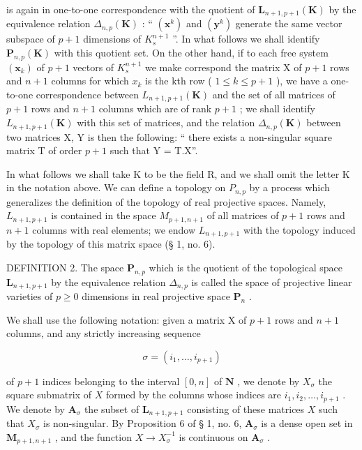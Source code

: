 is again in one-to-one correspondence with the quotient of \(\mathbf{L}_{n+1,p+1}(\mathbf{K})\) by the equivalence relation \(\Delta_{n,p}(\mathbf{K})\) : `` \((\mathbf{x}^{k})\) and \((\mathbf{y}^{k})\) generate the same vector subspace of \(p+1\) dimensions of \(K_{s}^{n+1}\) ''. In what follows we shall identify \(\mathbf{P}_{n,p}(\mathbf{K})\) with this quotient set. On the other hand, if to each free system \((\mathbf{x}_{k})\) of \(p+1\) vectors of \(K_{s}^{n+1}\) we make correspond the matrix X of \(p+1\) rows and \(n+1\) columns for which \(x_{k}\) is the kth row ( \(1\leqslant k\leqslant p+1\) ), we have a one-to-one correspondence between \(L_{n+1,p+1}(\mathbf{K})\) and the set of all matrices of \(p+1\) rows and \(n+1\) columns which are of rank \(p+1\) ; we shall identify \(L_{n+1,p+1}(\mathbf{K})\) with this set of matrices, and the relation \(\Delta_{n,p}(\mathbf{K})\) between two matrices X, Y is then the following: `` there exists a non-singular square matrix T of order \(p+1\) such that Y = T.X''.

In what follows we shall take K to be the field R, and we shall omit the letter K in the notation above. We can define a topology on \(P_{n,p}\) by a process which generalizes the definition of the topology of real projective spaces. Namely, \(L_{n+1, p+1}\) is contained in the space \(M_{p+1, n+1}\) of all matrices of \(p + 1\) rows and \(n + 1\) columns with real elements; we endow \(L_{n+1, p+1}\) with the topology induced by the topology of this matrix space (§ 1, no. 6).

DEFINITION 2. The space \(\mathbf{P}_{n,p}\) which is the quotient of the topological space \(\mathbf{L}_{n+1,p+1}\) by the equivalence relation \(\Delta_{n,p}\) is called the space of projective linear varieties of \(p\geqslant0\) dimensions in real projective space \(\mathbf{P}_{n}\) .

We shall use the following notation: given a matrix X of \(p + 1\) rows and \(n + 1\) columns, and any strictly increasing sequence

\[
\sigma = (i _ {1}, \dots , i _ {p + 1})
\]

of \(p + 1\) indices belonging to the interval \([0, n]\) of \(\mathbf{N}\) , we denote by \(X_{\sigma}\) the square submatrix of \(X\) formed by the columns whose indices are \(i_1, i_2, \ldots, i_{p+1}\) . We denote by \(\mathbf{A}_{\sigma}\) the subset of \(\mathbf{L}_{n+1, p+1}\) consisting of these matrices \(X\) such that \(X_{\sigma}\) is non-singular. By Proposition 6 of § 1, no. 6, \(\mathbf{A}_{\sigma}\) is a dense open set in \(\mathbf{M}_{p+1, n+1}\) , and the function \(X \to X_{\sigma}^{-1}\) is continuous on \(\mathbf{A}_{\sigma}\) .

